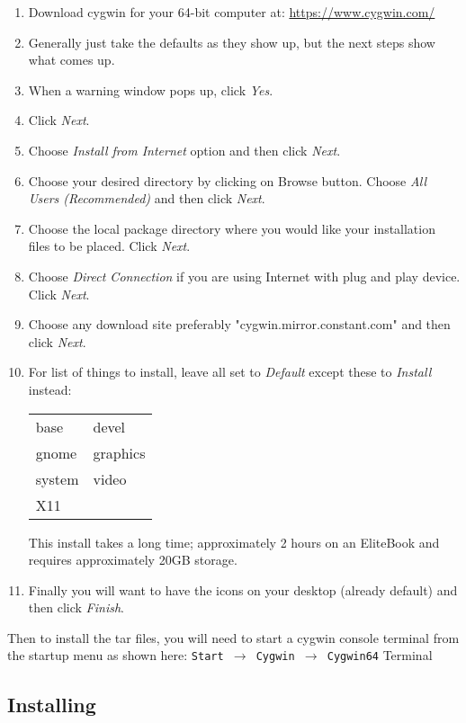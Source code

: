 \begin{enumerate}
	\item Download cygwin for your 64-bit computer at: {\small \url{https://www.cygwin.com/}}
	\item Generally just take the defaults as they show up, but the next steps show what comes up.
	\item When a warning window pops up, click \textit{Yes}.
	\item Click \textit{Next}.
	\item Choose \textit{Install from Internet} option and then click \textit{Next}.
	\item Choose your desired directory by clicking on Browse button. Choose \textit{All Users (Recommended)} and then click \textit{Next}.
	\item Choose the local package directory where you would like your installation files to be placed. Click \textit{Next}.
	\item Choose \textit{Direct Connection} if you are using Internet with plug and play device. Click \textit{Next}.
	\item Choose any download site preferably "cygwin.mirror.constant.com" and then click \textit{Next}.
	\item For list of things to install, leave all set to \textit{Default} except these to \textit{Install} instead:

\begin{tabular}{ll}
	base& devel\\
	gnome& graphics\\
	system& video\\
	X11 \\
\end{tabular}

     This install takes a long time; approximately 2 hours on an EliteBook and requires approximately 20GB storage.
	\item Finally you will want to have the icons on your desktop (already default) and then click \textit{Finish}.
\end{enumerate}

Then to install the \CGG{} tar files, you will need to start a cygwin console terminal from the startup menu as shown here:
	\texttt{Start $\rightarrow$ Cygwin $\rightarrow$ Cygwin64} Terminal

\subsection*{Installing \CGG{}}
\label{sec:installing_cinelerra}

